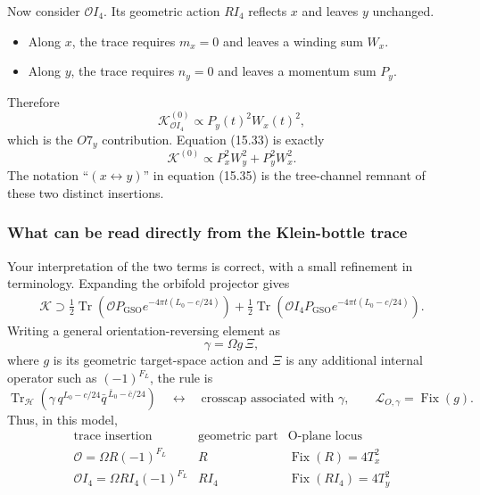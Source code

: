 \documentclass[
  10pt,
  a4paper,
  openany]{book}
\providecommand{\tightlist}{%
  \setlength{\itemsep}{0pt}\setlength{\parskip}{0pt}}
\begin{document}
Now consider \(\mathcal OI_4\). Its geometric action \(RI_4\) reflects
\(x\) and leaves \(y\) unchanged.

\begin{itemize}
\tightlist
\item
  Along \(x\), the trace requires \(m_x=0\) and leaves a winding sum
  \(W_x\).
\item
  Along \(y\), the trace requires \(n_y=0\) and leaves a momentum sum
  \(P_y\).
\end{itemize}

Therefore \[
\mathcal K_{\mathcal OI_4}^{(0)}
\propto
P_y(t)^2W_x(t)^2,
\] which is the \(O7_y\) contribution. Equation (15.33) is exactly \[
\boxed{
\mathcal K^{(0)}
\propto
P_x^2W_y^2
+
P_y^2W_x^2
}.
\] The notation ``\((x\leftrightarrow y)\)'' in equation (15.35) is the
tree-channel remnant of these two distinct insertions.

\subsubsection{What can be read directly from the Klein-bottle
trace}\label{what-can-be-read-directly-from-the-klein-bottle-trace}

Your interpretation of the two terms is correct, with a small refinement
in terminology. Expanding the orbifold projector gives \[
\begin{aligned}
\mathcal K
\supset
\frac12\operatorname{Tr}
\left(
\mathcal O
P_{\mathrm{GSO}}
e^{-4\pi t(L_0-c/24)}
\right)
+
\frac12\operatorname{Tr}
\left(
\mathcal O I_4
P_{\mathrm{GSO}}
e^{-4\pi t(L_0-c/24)}
\right).
\end{aligned}
\] Writing a general orientation-reversing element as \[
\gamma
=
\Omega g\,\Xi,
\] where \(g\) is its geometric target-space action and \(\Xi\) is any
additional internal operator such as \((-1)^{F_L}\), the rule is \[
\boxed{
\operatorname{Tr}_{\mathcal H}
\left(
\gamma\,q^{L_0-c/24}\bar q^{\,\bar L_0-\bar c/24}
\right)
\quad\longleftrightarrow\quad
\text{crosscap associated with }\gamma,
\qquad
\mathcal L_{O,\gamma}
=
\operatorname{Fix}(g).
}
\] Thus, in this model, \[
\begin{array}{c|c|c}
\text{trace insertion}
&\text{geometric part}
&\text{O-plane locus}\\ \hline
\mathcal O=\Omega R(-1)^{F_L}
&R
&\operatorname{Fix}(R)=4T_x^2\\
\mathcal OI_4=\Omega RI_4(-1)^{F_L}
&RI_4
&\operatorname{Fix}(RI_4)=4T_y^2
\end{array}
\]
\end{document}
